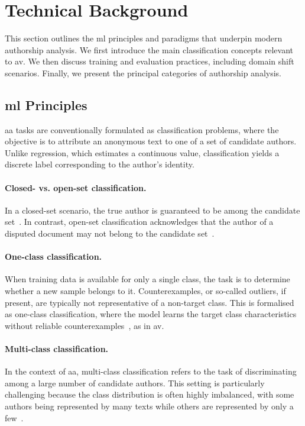 \section{Technical Background}
\label{sec:technical_background}

This section outlines the \ac{ml} principles and paradigms that underpin modern authorship analysis. 
We first introduce the main classification concepts relevant to \ac{av}. 
We then discuss training and evaluation practices, including domain shift scenarios. 
Finally, we present the principal categories of authorship analysis.

\subsection{\acl{ml} Principles}

\ac{aa} tasks are conventionally formulated as classification problems, where the objective is to attribute an anonymous text to one of a set of candidate authors. 
Unlike regression, which estimates a continuous value, classification yields a discrete label corresponding to the author’s identity.

\paragraph{Closed- vs. open-set classification.} 
In a closed-set scenario, the true author is guaranteed to be among the candidate set~\citep{koppel_authorship_2011}. 
In contrast, open-set classification acknowledges that the author of a disputed document may not belong to the candidate set~\citep{stamatatos_survey_2009}. 

\paragraph{One-class classification.} 
When training data is available for only a single class, the task is to determine whether a new sample belongs to it. 
Counterexamples, or so-called outliers, if present, are typically not representative of a non-target class. 
This is formalised as one-class classification, where the model learns the target class characteristics without reliable counterexamples~\citep{stein_intrinsic_2011,koppel_authorship_2004}, as in \ac{av}.

\paragraph{Multi-class classification.} 
In the context of \ac{aa}, multi-class classification refers to the task of discriminating among a large number of candidate authors. 
This setting is particularly challenging because the class distribution is often highly imbalanced, with some authors being represented by many texts while others are represented by only a few~\citep{stamatatos_survey_2009,koppel_authorship_2004,elmanarelbouanani_authorship_2014}. 


